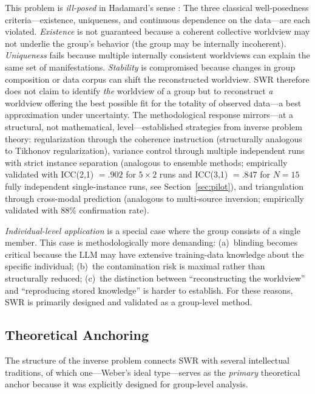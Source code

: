 \documentclass[11pt,a4paper]{article}
\theoremstyle{definition}
\theoremstyle{plain}
\theoremstyle{remark}
\begin{document}
This problem is \emph{ill-posed} in Hadamard's sense \citep{Hadamard1923}: The three classical well-posedness criteria---existence, uniqueness, and continuous dependence on the data---are each violated. \emph{Existence} is not guaranteed because a coherent collective worldview may not underlie the group's behavior (the group may be internally incoherent). \emph{Uniqueness} fails because multiple internally consistent worldviews can explain the same set of manifestations. \emph{Stability} is compromised because changes in group composition or data corpus can shift the reconstructed worldview. SWR therefore does not claim to identify \emph{the} worldview of a group but to reconstruct \emph{a} worldview offering the best possible fit for the totality of observed data---a best approximation under uncertainty. The methodological response mirrors---at a structural, not mathematical, level---established strategies from inverse problem theory: regularization through the coherence instruction (structurally analogous to Tikhonov regularization), variance control through multiple independent runs with strict instance separation (analogous to ensemble methods; empirically validated with ICC(2,1) $= .902$ for $5 \times 2$ runs and ICC(3,1) $= .847$ for $N = 15$ fully independent single-instance runs, see Section~\ref{sec:pilot}), and triangulation through cross-modal prediction (analogous to multi-source inversion; empirically validated with 88\% confirmation rate).

\emph{Individual-level application} is a special case where the group consists of a single member. This case is methodologically more demanding: (a)~blinding becomes critical because the LLM may have extensive training-data knowledge about the specific individual; (b)~the contamination risk is maximal rather than structurally reduced; (c)~the distinction between ``reconstructing the worldview'' and ``reproducing stored knowledge'' is harder to establish. For these reasons, SWR is primarily designed and validated as a group-level method.


\subsection{Theoretical Anchoring}

The structure of the inverse problem connects SWR with several intellectual traditions, of which one---Weber's ideal type---serves as the \emph{primary} theoretical anchor because it was explicitly designed for group-level analysis.
\end{document}
